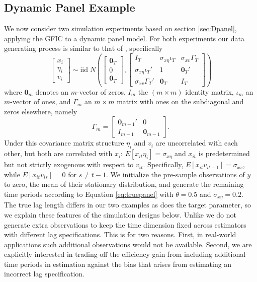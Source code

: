 \subsection{Dynamic Panel Example}
\label{sec:Dpanel_sim}
We now consider two simulation experiments based on section \ref{sec:Dpanel}, applying the GFIC to a dynamic panel model. 
For both experiments our data generating process is similar to that of \cite{AndrewsLu}, specifically
	\begin{equation}
	\label{eq:covar}
		\left[\begin{array}{c}
			x_{i}\\
			\eta_i\\
			v_{i}
  \end{array} \right]\sim \mbox{iid}\; N\left(\left[\begin{array}{c}\mathbf{0}_T\\ 0\\ \mathbf{0}_T \end{array}\right] ,\left[\begin{array}{ccc}
	 	 I_T & \sigma_{x\eta}\iota_T&\sigma_{xv}\Gamma_T \\
     \sigma_{x\eta}\iota_T'& 1&\mathbf{0}_T' \\
     \sigma_{xv}\Gamma_T'& \mathbf{0}_T&  I_T
	 \end{array}\right]\right)
	\end{equation}
where $\mathbf{0}_m$ denotes an $m$-vector of zeros, $I_m$ the $(m\times m)$ identity matrix, $\iota_m$ an $m$-vector of ones, and $\Gamma_m$ an $m\times m$ matrix with ones on the subdiagonal and zeros elsewhere, namely
	\begin{equation}
		\Gamma_m = \left[\begin{array}{cc}
        \mathbf{0}_{m-1}' & 0\\
        I_{m-1} & \mathbf{0}_{m-1}
	 \end{array}\right].
	\end{equation}
Under this covariance matrix structure $\eta_i$ and $v_{i}$ are uncorrelated with each other, but both are correlated with $x_{i}$: $E[x_{it}\eta_i]=\sigma_{x\eta}$ and $x_{it}$ is predetermined but not strictly exogenous with respect to $v_{it}$. Specifically, $E[x_{it}v_{it-1}]=\sigma_{xv}$, while $E[x_{it}v_{is}]=0$ for $s\neq t-1$. 
We initialize the pre-sample observations of $y$ to zero, the mean of their stationary distribution, and generate the remaining time periods according to Equation \ref{eq:truepanel} with $\theta = 0.5$ and $\sigma_{x\eta} = 0.2$.
The true lag length differs in our two examples as does the target parameter, so we explain these features of the simulation designs below. 
Unlike \cite{AndrewsLu} we do not generate extra observations to keep the time dimension fixed across estimators with different lag specifications.
This is for two reasons. 
First, in real-world applications such additional observations would not be available. 
Second, we are explicitly interested in trading off the efficiency gain from including additional time periods in estimation against the bias that arises from estimating an incorrect lag specification. 

